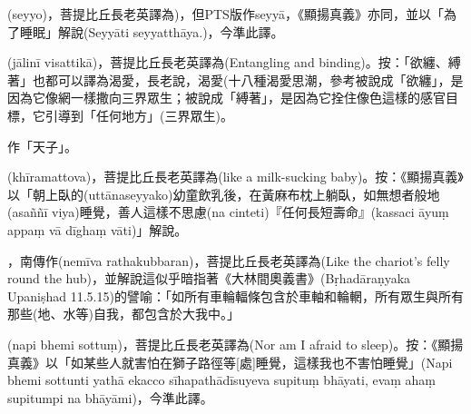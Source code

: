 \startitemgroup[noteitems]
\item{}(seyyo)，菩提比丘長老英譯為)，但PTS版作seyyā，《顯揚真義》亦同，並以「為了睡眠」解說(Seyyāti seyyatthāya.)，今準此譯。
\stopitemgroup

\startitemgroup[noteitems]
\item{}(jālinī visattikā)，菩提比丘長老英譯為(Entangling and binding)。按：「欲纏、縛著」也都可以譯為渴愛，長老說，渴愛(十八種渴愛思潮，參考被說成「欲纏」，是因為它像網一樣撒向三界眾生；被說成「縛著」，是因為它拴住像色這樣的感官目標，它引導到「任何地方」(三界眾生)。
\stopitemgroup

\startitemgroup[noteitems]
\item{}作「天子」。
\stopitemgroup

\startitemgroup[noteitems]
\item{}(khīramattova)，菩提比丘長老英譯為(like a milk-sucking baby)。按：《顯揚真義》以「朝上臥的(uttānaseyyako)幼童飲乳後，在黃麻布枕上躺臥，如無想者般地(asaññī viya)睡覺，善人這樣不思慮(na cinteti)『任何長短壽命』(kassaci āyuṃ appaṃ vā dīghaṃ vāti)」解說。
\stopitemgroup

\startitemgroup[noteitems]
\item{}，南傳作(nemīva rathakubbaran)，菩提比丘長老英譯為(Like the chariot's felly round the hub)，並解說這似乎暗指著《大林間奧義書》(Bṛhadāraṇyaka Upaniṣhad 11.5.15)的譬喻：「如所有車輪輻條包含於車軸和輪輞，所有眾生與所有那些(地、水等)自我，都包含於大我中。」
\stopitemgroup

\startitemgroup[noteitems]
\item{}(napi bhemi sottuṃ)，菩提比丘長老英譯為(Nor am I afraid to sleep)。按：《顯揚真義》以「如某些人就害怕在獅子路徑等[處]睡覺，這樣我也不害怕睡覺」(Napi bhemi sottunti yathā ekacco sīhapathādīsuyeva supituṃ bhāyati, evaṃ ahaṃ supitumpi na bhāyāmi)，今準此譯。
\stopitemgroup


